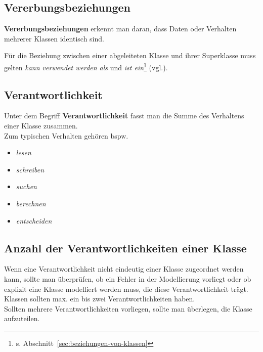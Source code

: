 \subsection*{Vererbungsbeziehungen}
\textbf{Vererbungsbeziehungen} erkennt man daran, dass Daten oder Verhalten mehrerer Klassen identisch sind.

\vspace{2mm}
\begin{tcolorbox}
    Für die Beziehung zwischen einer abgeleiteten Klasse und ihrer Superklasse muss gelten
    \textit{kann verwendet werden als} und \textit{ist ein}\footnote{
    s. Abschnitt~\ref{sec:beziehungen-von-klassen}
    } (vgl.\cite[16]{Wed09b}).
\end{tcolorbox}
\vspace{2mm}


\subsection*{Verantwortlichkeit}
Unter dem Begriff \textbf{Verantwortlichkeit} fasst man die Summe des Verhaltens einer Klasse zusammen.\\
Zum typischen Verhalten gehören bspw.

\begin{itemize}
    \item \textit{lesen}
    \item \textit{schreiben}
    \item \textit{suchen}
    \item \textit{berechnen}
    \item \textit{entscheiden}
\end{itemize}

\subsection*{Anzahl der Verantwortlichkeiten einer Klasse}
Wenn eine Verantwortlichkeit nicht eindeutig einer Klasse zugeordnet werden kann, sollte man überprüfen, ob ein Fehler in der Modellierung vorliegt oder ob explizit eine Klasse modelliert werden muss, die diese Verantwortlichkeit trägt.\\

\noindent
Klassen sollten max. ein bis zwei Verantwortlichkeiten haben.\\
Sollten mehrere Verantwortlichkeiten vorliegen, sollte man überlegen, die Klasse aufzuteilen.